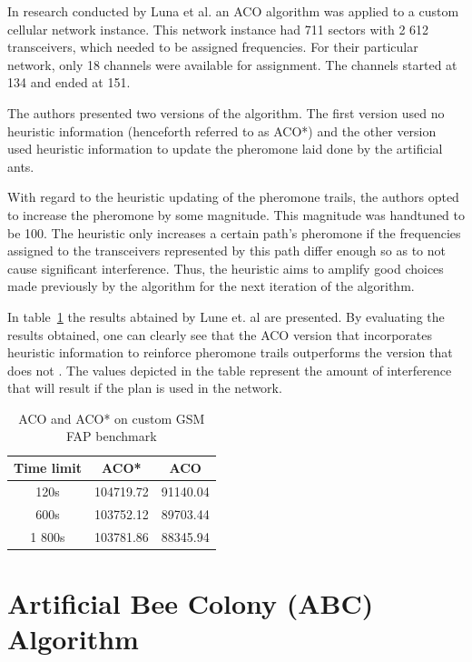 In research conducted by Luna et al.\cite{ACOvsEA} an \gls{ACO} algorithm was applied to a custom cellular network instance. This network instance had 711 sectors with 2 612 transceivers, which needed to be assigned frequencies. For their particular network, only 18 channels were available for assignment. The channels started at 134 and ended at 151\cite{ACOvsEA}.

The authors presented two versions of the algorithm. The first version used no heuristic information (henceforth referred to as \gls{ACO}*) and the other version used heuristic information to update the pheromone laid done by the artificial ants\cite{ACOvsEA}.

With regard to the heuristic updating of the pheromone trails, the authors opted to increase the pheromone by some magnitude\cite{ACOvsEA}. This magnitude was handtuned to be 100. The heuristic only increases a certain path's pheromone if the frequencies assigned to the transceivers represented by this path differ enough so as to not cause significant interference\cite{ACOvsEA}. Thus, the heuristic aims to amplify good choices made previously by the algorithm for the next iteration of the algorithm.

In table~\ref{tab:ACO} the results abtained by Lune et. al \cite{ACOvsEA} are presented. By evaluating the results obtained, one can clearly see that the \gls{ACO} version that incorporates heuristic information to reinforce pheromone trails outperforms the version that does not \cite{ACOvsEA}. The values depicted in the table represent the amount of interference that will result if the plan is used in the network\cite{ACOvsEA}.
\begin{table}[H]
\centering
	\begin{tabular}{| c | c | c |}
	\hline
	Time limit & \gls{ACO}* & \gls{ACO} \\ \hline
	120s & 104719.72 & 91140.04 \\ \hline
	600s & 103752.12 & 89703.44 \\ \hline
	1 800s & 103781.86 & 88345.94 \\ \hline
	\end{tabular}
\caption{ACO and \gls{ACO}* on custom GSM \gls{FAP} benchmark\cite{ACOvsEA}}
\label{tab:ACO}
\end{table}
\newpage
\section{Artificial Bee Colony (ABC) Algorithm}
\label{sec:BEE}

